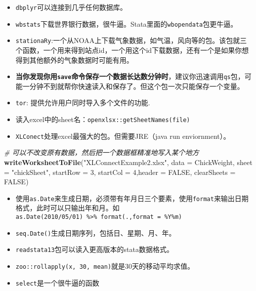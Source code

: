 \documentclass[
]{book}
\newenvironment{Shaded}{\begin{snugshade}}{\end{snugshade}}
\newcommand{\CommentTok}[1]{\textcolor[rgb]{0.56,0.35,0.01}{\textit{#1}}}
\newcommand{\DataTypeTok}[1]{\textcolor[rgb]{0.13,0.29,0.53}{#1}}
\newcommand{\DecValTok}[1]{\textcolor[rgb]{0.00,0.00,0.81}{#1}}
\newcommand{\KeywordTok}[1]{\textcolor[rgb]{0.13,0.29,0.53}{\textbf{#1}}}
\newcommand{\NormalTok}[1]{#1}
\newcommand{\OtherTok}[1]{\textcolor[rgb]{0.56,0.35,0.01}{#1}}
\newcommand{\StringTok}[1]{\textcolor[rgb]{0.31,0.60,0.02}{#1}}
\providecommand{\tightlist}{%
  \setlength{\itemsep}{0pt}\setlength{\parskip}{0pt}}
\begin{document}
\begin{itemize}
\tightlist
\item
  \texttt{dbplyr}可以连接到几乎任何数据库。
\item
  \texttt{wbstats}下载世界银行数据，很牛逼。Stata里面的\texttt{wbopendata}包更牛逼。
\item
  \texttt{stationaRy}:一个从NOAA上下载气象数据，如气温，风向等的包。该包就三个函数，一个用来得到站点id，一个用这个id下载数据，还有一个是如果你想得到其他额外的气象数据时可能有用。
\item
  \textbf{当你发现你用\texttt{save}命令保存一个数据长达数分钟时}，建议你迅速调用\texttt{qs}包，可能一分钟不到就帮你快速读入和保存了。但这个包一次只能保存一个变量。
\item
  \texttt{tor}: 提供允许用户同时导入多个文件的功能.
\item
  读入excel中的sheet名：\texttt{openxlsx::getSheetNames(file)}
\item
  \texttt{XLConect}处理excel最强大的包。但需要JRE（java run enviornment）。
\end{itemize}

\begin{Shaded}
\begin{Highlighting}[]
\CommentTok{# 可以不改变原有数据，然后把一个数据框精准地写入某个地方}
\KeywordTok{writeWorksheetToFile}\NormalTok{(}\StringTok{"XLConnectExample2.xlsx"}\NormalTok{, }\DataTypeTok{data =}\NormalTok{ ChickWeight,}
 \DataTypeTok{sheet =} \StringTok{"chickSheet"}\NormalTok{, }\DataTypeTok{startRow =} \DecValTok{3}\NormalTok{, }\DataTypeTok{startCol =} \DecValTok{4}\NormalTok{,}\DataTypeTok{header =} \OtherTok{FALSE}\NormalTok{, }\DataTypeTok{clearSheets =} \OtherTok{FALSE}\NormalTok{)}
\end{Highlighting}
\end{Shaded}

\begin{itemize}
\item
  使用\texttt{as.Date}来生成日期，必须带有年月日三个要素，使用\texttt{format}来输出日期格式，此时可以只输出年和月。如\texttt{as.Date(\textquotesingle{}2010/05/01\textquotesingle{})\ \%\textgreater{}\%\ format(.,format\ =\ \textquotesingle{}\%Y\%m\textquotesingle{})}
\item
  \texttt{seq.Date()}生成日期序列，包括日、星期、月、年。
\item
  \texttt{readstata13}包可以读入更高版本的stata数据格式。
\item
  \texttt{zoo::rollapply(x,\ 30,\ mean)}就是30天的移动平均求值。
\item
  \texttt{select}是一个很牛逼的函数
\end{itemize}
\end{document}
